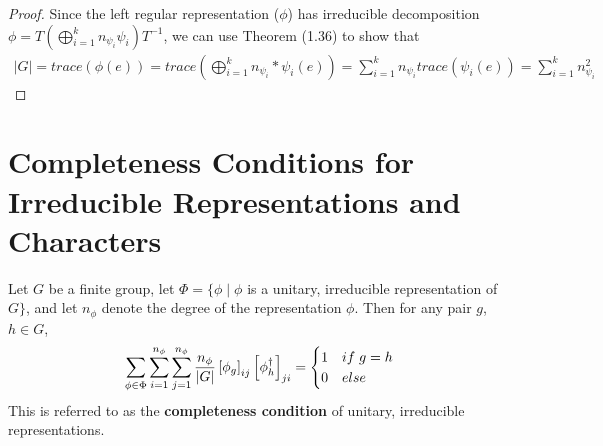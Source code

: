 \noindent\begin{proof}\cite{Tung}  Since the left regular representation ($\phi$) has irreducible decomposition $\phi = T\left(\bigoplus_{i=1}^k n_{\psi_i}\psi_i\right)T^{-1}$, we can use Theorem (1.36) to show that
\begin{equation}
	\begin{aligned}
		|G| = trace(\phi(e)) = trace\left(\bigoplus_{i=1}^k n_{\psi_i}*\psi_i(e)\right) = \sum_{i=1}^k n_{\psi_i}trace(\psi_i(e)) = \sum_{i=1}^k n_{\psi_i}^2 
	\end{aligned}
\end{equation}
\end{proof}

\section{Completeness Conditions for Irreducible Representations and Characters}


\begin{theorem}
	Let $G$ be a finite group, let $\Phi = \{\phi \mid \phi$ is a unitary, irreducible representation of $G\}$, and let $n_\phi$ denote the degree of the representation $\phi$. Then for any pair $g$, $h \in G$, 
$$\sum_{\phi \in \Phi} \sum_{i=1}^{n_\phi} \sum_{j=1}^{n_\phi} \frac{n_\phi}{|G|} \left[\phi_g\right]_{ij}\left[\phi_{h}^\dag\right]_{ji} = \begin{cases}
																										1 & if \hspace{1mm} g = h \\
																										0 & else
																									\end{cases}$$
This is referred to as the \textbf{completeness condition} of unitary, irreducible representations.
\end{theorem}


